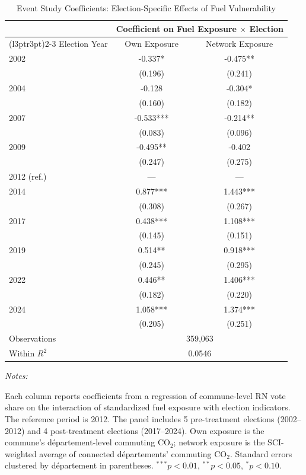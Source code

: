 \begin{table}[!h]
\centering
\caption{Event Study Coefficients: Election-Specific Effects of Fuel Vulnerability}
\centering
\fontsize{10}{12}\selectfont
\begin{threeparttable}
\begin{tabular}[t]{lcc}
\toprule
\multicolumn{1}{c}{ } & \multicolumn{2}{c}{Coefficient on Fuel Exposure $\times$ Election} \\
\cmidrule(l{3pt}r{3pt}){2-3}
Election Year & Own Exposure & Network Exposure\\
\midrule
2002 & -0.337* & -0.475**\\
 & (0.196) & (0.241)\\
2004 & -0.128 & -0.304*\\
 & (0.160) & (0.182)\\
2007 & -0.533*** & -0.214**\\
 & (0.083) & (0.096)\\
2009 & -0.495** & -0.402\\
 & (0.247) & (0.275)\\
2012 (ref.) & --- & ---\\
2014 & 0.877*** & 1.443***\\
 & (0.308) & (0.267)\\
2017 & 0.438*** & 1.108***\\
 & (0.145) & (0.151)\\
2019 & 0.514** & 0.918***\\
 & (0.245) & (0.295)\\
2022 & 0.446** & 1.406***\\
 & (0.182) & (0.220)\\
2024 & 1.058*** & 1.374***\\
 & (0.205) & (0.251)\\
\midrule Observations & \multicolumn{2}{c}{359,063} \\
Within $R^2$ & \multicolumn{2}{c}{0.0546} \\
\bottomrule
\end{tabular}
\begin{tablenotes}
\item \textit{Notes:} 
\item Each column reports coefficients from a regression of commune-level RN vote share on the interaction of standardized fuel exposure with election indicators. The reference period is 2012. The panel includes 5 pre-treatment elections (2002--2012) and 4 post-treatment elections (2017--2024). Own exposure is the commune's d\'{e}partement-level commuting CO$_2$; network exposure is the SCI-weighted average of connected d\'{e}partements' commuting CO$_2$. Standard errors clustered by d\'{e}partement in parentheses. $^{***}p<0.01$, $^{**}p<0.05$, $^{*}p<0.10$.
\end{tablenotes}
\end{threeparttable}
\end{table}
